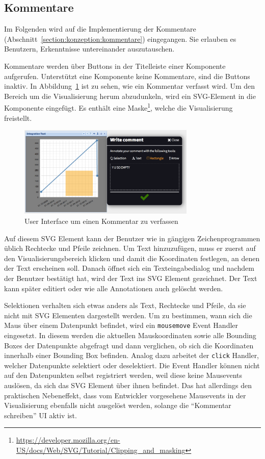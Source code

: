 \documentclass[
	headsepline,
	footsepline,
	fontsize=12pt,
	bibliography=totoc
]{scrbook}
\begin{document}
\subsection{Kommentare}
\label{section:implementierung:frontend:kommentare}

Im Folgenden wird auf die Implementierung der Kommentare (Abschnitt~\ref{section:konzeption:kommentare}) eingegangen. Sie erlauben es Benutzern, Erkenntnisse untereinander auszutauschen.

Kommentare werden über Buttons in der Titelleiste einer Komponente aufgerufen. Unterstützt eine Komponente keine Kommentare, sind die Buttons inaktiv. In Abbildung~\ref{figure:ui-write-comment} ist zu sehen, wie ein Kommentar verfasst wird. Um den Bereich um die Visualisierung herum abzudunkeln, wird ein SVG-Element in die Komponente eingefügt. Es enthält eine Maske\footnote{\url{https://developer.mozilla.org/en-US/docs/Web/SVG/Tutorial/Clipping_and_masking}}, welche die Visualisierung freistellt.

\begin{figure}[htbp]
   \centering
   \includegraphics[width=0.75\textwidth]{images/implementierung-ui-write-comment.png}
   \caption{User Interface um einen Kommentar zu verfassen}
   \label{figure:ui-write-comment}
\end{figure}

Auf diesem SVG Element kann der Benutzer wie in gängigen Zeichenprogrammen üblich Rechtecke und Pfeile zeichnen. Um Text hinzuzufügen, muss er zuerst auf den Visualisierungsbereich klicken und damit die Koordinaten festlegen, an denen der Text erscheinen soll. Danach öffnet sich ein Texteingabedialog und nachdem der Benutzer bestätigt hat, wird der Text ins SVG Element gezeichnet. Der Text kann später editiert oder wie alle Annotationen auch gelöscht werden.

Selektionen verhalten sich etwas anders als Text, Rechtecke und Pfeile, da sie nicht mit SVG Elementen dargestellt werden. Um zu bestimmen, wann sich die Maus über einem Datenpunkt befindet, wird ein \texttt{mousemove} Event Handler eingesetzt. In diesem werden die aktuellen Mauskoordinaten sowie alle Bounding Boxes der Datenpunkte abgefragt und dann verglichen, ob sich die Koordinaten innerhalb einer Bounding Box befinden. Analog dazu arbeitet der \texttt{click} Handler, welcher Datenpunkte selektiert oder deselektiert. Die Event Handler können nicht auf den Datenpunkten selbst registriert werden, weil diese keine Mausevents auslösen, da sich das SVG Element über ihnen befindet. Das hat allerdings den praktischen Nebeneffekt, dass vom Entwickler vorgesehene Mausevents in der Visualisierung ebenfalls nicht ausgelöst werden, solange die \enquote{Kommentar schreiben} UI aktiv ist.
\end{document}
